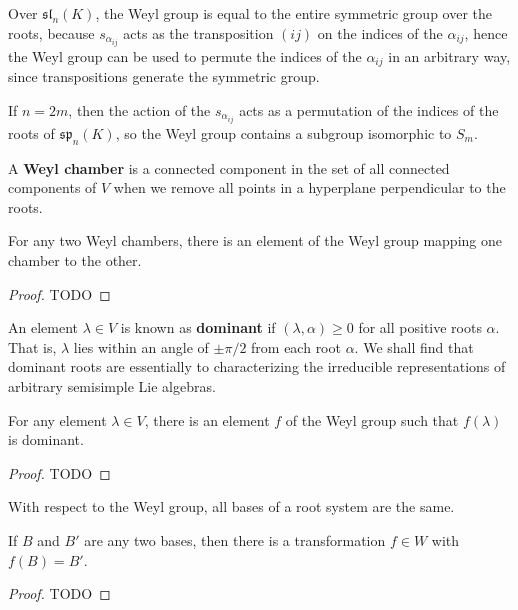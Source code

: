 \begin{example}
    Over $\mathfrak{sl}_n(K)$, the Weyl group is equal to the entire symmetric group over the roots, because $s_{\alpha_{ij}}$ acts as the transposition $(ij)$ on the indices of the $\alpha_{ij}$, hence the Weyl group can be used to permute the indices of the $\alpha_{ij}$ in an arbitrary way, since transpositions generate the symmetric group.
\end{example}

\begin{example}
    If $n = 2m$, then the action of the $s_{\alpha_{ij}}$ acts as a permutation of the indices of the roots of $\mathfrak{sp}_n(K)$, so the Weyl group contains a subgroup isomorphic to $S_m$.
\end{example}

A {\bf Weyl chamber} is a connected component in the set of all connected components of $V$ when we remove all points in a hyperplane perpendicular to the roots.

\begin{theorem}
    For any two Weyl chambers, there is an element of the Weyl group mapping one chamber to the other.
\end{theorem}
\begin{proof}
    TODO
\end{proof}

An element $\lambda \in V$ is known as {\bf dominant} if $(\lambda, \alpha) \geq 0$ for all positive roots $\alpha$. That is, $\lambda$ lies within an angle of $\pm \pi/2$ from each root $\alpha$. We shall find that dominant roots are essentially to characterizing the irreducible representations of arbitrary semisimple Lie algebras.

\begin{theorem}
    For any element $\lambda \in V$, there is an element $f$ of the Weyl group such that $f(\lambda)$ is dominant.
\end{theorem}
\begin{proof}
    TODO
\end{proof}

With respect to the Weyl group, all bases of a root system are the same.

\begin{theorem}
    If $B$ and $B'$ are any two bases, then there is a transformation $f \in W$ with $f(B) = B'$.
\end{theorem}
\begin{proof}
    TODO
\end{proof}

